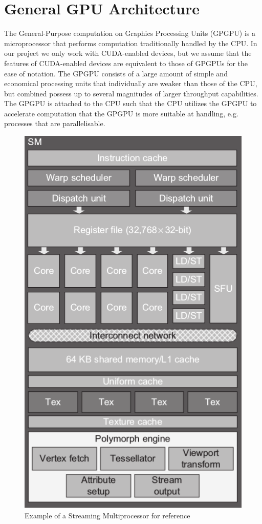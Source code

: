 \section{General GPU Architecture}
\label{sec:gpu}

The General-Purpose computation on Graphics Processing Units (GPGPU) is a microprocessor that performs computation traditionally handled by the CPU.
In our project we only work with CUDA-enabled devices, but we assume that the features of CUDA-enabled devices are equivalent to those of GPGPUs for the ease of notation.
The GPGPU consists of a large amount of simple and economical processing units that individually are weaker than those of the CPU, but combined possess up to several magnitudes of larger throughput capabilities.
The GPGPU is attached to the CPU such that the CPU utilizes the GPGPU to accelerate computation that the GPGPU is more suitable at handling, e.g. processes that are parallelisable.

\begin{figure}[htb]
  \centering
  \includegraphics[width=.5\textwidth]{graphics/images/cropped-cuda-sm.png}
  \caption{Example of a Streaming Multiprocessor for reference~\cite{farber2011cuda}}
  \label{fig:sm example}
\end{figure}

